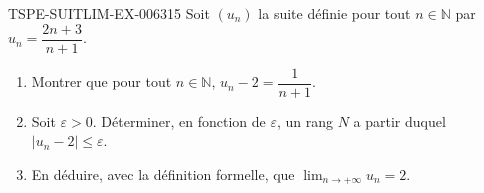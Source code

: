 \begin{exercice}{TSPE-SUITLIM-EX-006}{3}{15}
Soit $(u_n)$ la suite définie pour tout $n \in \mathbb{N}$ par $u_n = \dfrac{2n+3}{n+1}$.
\begin{enumerate}
  \item Montrer que pour tout $n \in \mathbb{N}$, $u_n - 2 = \dfrac{1}{n+1}$.
  \item Soit $\varepsilon > 0$. Déterminer, en fonction de $\varepsilon$, un rang $N$ a partir duquel $|u_n - 2| \leq \varepsilon$.
  \item En déduire, avec la définition formelle, que $\lim_{n \to +\infty} u_n = 2$.
\end{enumerate}
\end{exercice}
